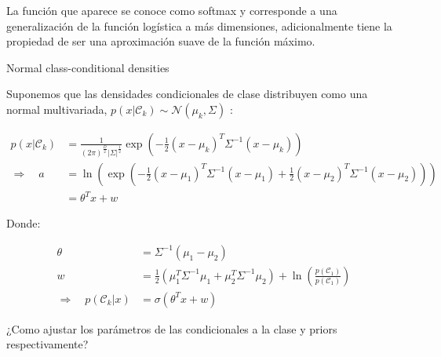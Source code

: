 La función que aparece se conoce como softmax y corresponde a una generalización de la función logística a más dimensiones, adicionalmente tiene la propiedad de ser una aproximación suave de la función máximo.

\newpage

 Normal class-conditional densities

Suponemos que las densidades condicionales de clase distribuyen como una normal multivariada, $p(x|\mathcal{C}_k) \sim \mathcal{N} (\mu_k,\Sigma)$ :

\begin{align}
p(x|\mathcal{C}_k)&=\frac{1}{(2\pi)^\frac{D}{2}|\Sigma|^\frac{1}{2}}\exp(-\frac{1}{2}(x-\mu_k)^T\Sigma^{-1}(x-\mu_k))\\
\Rightarrow \quad a &= \ln(\exp(-\frac{1}{2}(x-\mu_1)^T\Sigma^{-1}(x-\mu_1) +\frac{1}{2}(x-\mu_2)^T\Sigma^{-1}(x-\mu_2)))\\
&= \theta^Tx+w
\end{align}

Donde:

\begin{align}
\theta &= \Sigma^{-1}(\mu_1-\mu_2)\\
w &= \frac{1}{2}(\mu_1^T\Sigma^{-1}\mu_1+\mu_2^T\Sigma^{-1}\mu_2)
+\ln(\frac{p(\mathcal{C}_1)}{p(\mathcal{C}_1)})\\
\Rightarrow \quad p(\mathcal{C}_k|x) &= \sigma(\theta^Tx+w)
\end{align}

¿Como ajustar los parámetros de las condicionales a la clase y priors respectivamente?

